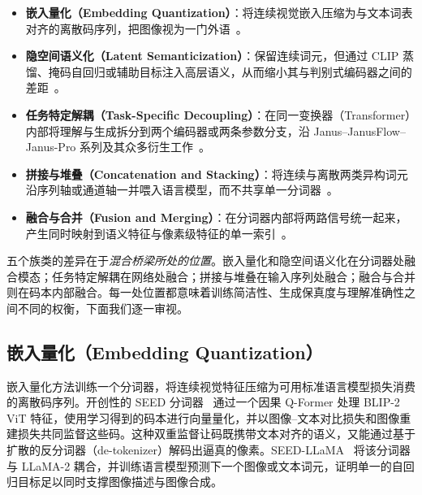 \begin{itemize}
    \item \textbf{嵌入量化（Embedding Quantization）}：将连续视觉嵌入压缩为与文本词表对齐的离散码序列，把图像视为一门外语~\cite{ge2023seed,ge2023seedllama,jin2024lavit,DBLP:conf/icml/Jin00XCJHSLZ0GM24,DBLP:conf/acl/ZhanDYZZLZYZL0F24,ge2024seedx}。
    \item \textbf{隐空间语义化（Latent Semanticization）}：保留连续词元，但通过 CLIP 蒸馏、掩码自回归或辅助目标注入高层语义，从而缩小其与判别式编码器之间的差距~\cite{DBLP:conf/cvpr/YangYZRZ0Z25,lin2025toklip,xie2025showo2,huang2025minguni}。
    \item \textbf{任务特定解耦（Task-Specific Decoupling）}：在同一变换器（Transformer）内部将理解与生成拆分到两个编码器或两条参数分支，沿 Janus--JanusFlow--Janus-Pro 系列及其众多衍生工作~\cite{DBLP:conf/cvpr/WuCWMLPLXYR025,DBLP:conf/cvpr/MaLCLWWPXZYZW0R25,shi2024lmfusion,chen2025januspro,zhuang2025vargpt,fan2025unifluid,zhuang2025vargptv11,tian2025unigen,liao2025mogao,deng2025bagel,wu2025omnigen2,wang2025ovisu1,xu2025pisces,lin2025uniworld,wang2025skyworkunipic,wei2025skyworkunipic2,wang2025lightfusion,tian2025unigen15}。
    \item \textbf{拼接与堆叠（Concatenation and Stacking）}：将连续与离散两类异构词元沿序列轴或通道轴一并喂入语言模型，而不共享单一分词器~\cite{huang2025illumeplus,jiao2025unitoken,he2025emma}。
    \item \textbf{融合与合并（Fusion and Merging）}：在分词器内部将两路信号统一起来，产生同时映射到语义特征与像素级特征的单一索引~\cite{DBLP:conf/iccv/XieDSL25,DBLP:conf/cvpr/QuZLWJGYDYW25,chen2025semhitok}。
\end{itemize}

五个族类的差异在于\emph{混合桥梁所处的位置}。嵌入量化和隐空间语义化在分词器处融合模态；任务特定解耦在网络处融合；拼接与堆叠在输入序列处融合；融合与合并则在码本内部融合。每一处位置都意味着训练简洁性、生成保真度与理解准确性之间不同的权衡，下面我们逐一审视。

\subsection{嵌入量化（Embedding Quantization）}
\label{subsec:embed-quant}

嵌入量化方法训练一个分词器，将连续视觉特征压缩为可用标准语言模型损失消费的离散码序列。开创性的 SEED 分词器~\cite{ge2023seed} 通过一个因果 Q-Former 处理 BLIP-2 ViT 特征，使用学习得到的码本进行向量量化，并以图像--文本对比损失和图像重建损失共同监督这些码。这种双重监督让码既携带文本对齐的语义，又能通过基于扩散的反分词器（de-tokenizer）解码出逼真的像素。SEED-LLaMA~\cite{ge2023seedllama} 将该分词器与 LLaMA-2 耦合，并训练语言模型预测下一个图像或文本词元，证明单一的自回归目标足以同时支撑图像描述与图像合成。

